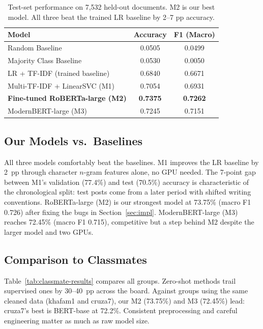 \documentclass[11pt]{article}
\begin{document}
\begin{table}[h]
\centering
\small
\begin{tabular}{lcc}
\toprule
\textbf{Model} & \textbf{Accuracy} & \textbf{F1 (Macro)} \\
\midrule
Random Baseline                          & 0.0505 & 0.0499 \\
Majority Class Baseline                  & 0.0530 & 0.0050 \\
LR + TF-IDF (trained baseline)           & 0.6840 & 0.6671 \\
\midrule
Multi-TF-IDF + LinearSVC (M1)            & 0.7054 & 0.6931 \\
\textbf{Fine-tuned RoBERTa-large (M2)}   & \textbf{0.7375} & \textbf{0.7262} \\
ModernBERT-large (M3)      & 0.7245 & 0.7151 \\
\bottomrule
\end{tabular}
\caption{\label{tab:our-results}
  Test-set performance on 7,532 held-out documents.  M2 is our best
  model.  All three beat the trained LR baseline by 2--7 pp accuracy.}
\end{table}

\subsection{Our Models vs.\ Baselines}

All three models comfortably beat the baselines.  M1 improves the LR
baseline by 2~pp through character $n$-gram features alone, no GPU
needed.  The 7-point gap between M1's validation (77.4\%) and test
(70.5\%) accuracy is characteristic of the chronological split: test
posts come from a later period with shifted writing conventions.
RoBERTa-large (M2) is our strongest model at 73.75\% (macro F1 0.726)
after fixing the bugs in Section~\ref{sec:impl}.  ModernBERT-large (M3)
reaches 72.45\% (macro F1 0.715), competitive but a step behind M2
despite the larger model and two GPUs.

\subsection{Comparison to Classmates}

Table~\ref{tab:classmate-results} compares all groups.  Zero-shot methods
trail supervised ones by 30--40~pp across the board.  Against groups
using the same cleaned data (khafam1 and cruza7), our M2 (73.75\%) and
M3 (72.45\%) lead: cruza7's best is BERT-base at 72.2\%.  Consistent
preprocessing and careful engineering matter as much as raw model size.
\end{document}
